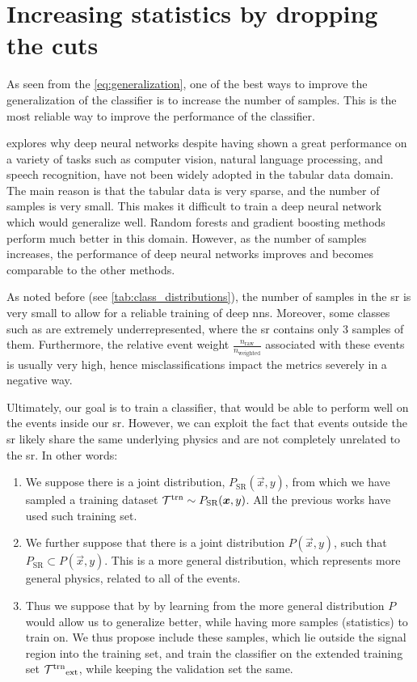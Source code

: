 \section{Increasing statistics by dropping the cuts}
\label{sec:extended-set}

As seen from the \autoref{eq:generalization}, one of the best ways to improve the generalization of the classifier is to
increase the number of samples. This is the most reliable way to improve the performance of the classifier.

\cite{tabular} explores why deep neural networks despite having shown a great performance on a variety of tasks such as
computer vision, natural language processing, and speech recognition, have not been widely adopted in the tabular data
domain. The main reason is that the tabular data is very sparse, and the number of samples is very small. This makes it
difficult to train a deep neural network which would generalize well. Random forests and gradient boosting methods
perform much better in this domain. However, as the number of samples increases, the performance of deep neural networks
improves and becomes comparable to the other methods.

As noted before (see \autoref{tab:class_distributions}), the number of samples in the \gls{sr} is very small to allow
for a reliable training of deep \glspl{nn}. Moreover, some classes such as \ttbar are extremely underrepresented,
where the \gls{sr} contains only 3 samples of them. Furthermore, the relative event weight
$\frac{n_\text{raw}}{n_\text{weighted}}$ associated with these events is usually very high, hence misclassifications
impact the metrics severely in a negative way.

Ultimately, our goal is to train a classifier, that would be able to perform well on the events inside our \gls{sr}.
However, we can exploit the fact that events outside the \gls{sr} likely share the same underlying physics and are not
completely unrelated to the \gls{sr}. In other words:

\begin{enumerate}
    \item We suppose there is a joint distribution, $P_\text{SR}(\vec{x}, y)$, from which we have sampled a
          training dataset ${\mathcal{T}^\text{trn}} \sim P_\text{SR}({\boldsymbol{x}}, y)$. All the previous works have used such training set.
    \item We further suppose that there is a joint distribution $P(\vec{x}, y)$, such that $P_\text{SR} \subset
              P(\vec{x}, y)$. This is a more general distribution, which represents more general physics, related to
          all of the events.
    \item Thus we suppose that by by learning from the more general distribution $P$ would allow us to generalize
          better, while having more samples (statistics) to train on. We thus propose include these samples, which lie
          outside the signal region into the training set, and train the classifier on the extended training set
          ${\mathcal{T}^\text{trn}}_\text{ext}$, while keeping the validation set the same.
\end{enumerate}

